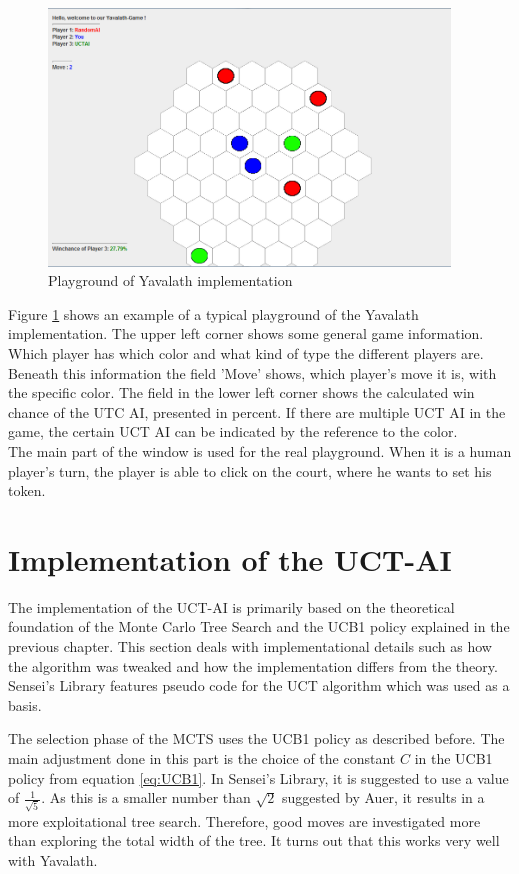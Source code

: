 \documentclass[english]{report} \usepackage[english]{babel}
\begin{document}
\begin{figure}[ht]
\centering
\includegraphics[width=0.95\textwidth]{Abbildungen/exampleOfPlayGround.png}
\caption[Playground of Yavalath implementation]{Playground of Yavalath implementation}
\label{fig:playgroundOfYav}
\end{figure} 

\noindent Figure \ref{fig:playgroundOfYav} shows an example of a typical
playground of the Yavalath implementation.
The upper left corner shows some general game information. Which player has
which color and what kind of type the different players are. Beneath this
information the field 'Move' shows, which player's move it is, with the specific
color. The field in the lower left corner shows the calculated win chance of the
UTC AI, presented in percent. If there are multiple UCT AI in the game, the
certain UCT AI can be indicated by the reference to the color.  \\
The main part of the window is used for the real playground. When it is a human
player's turn, the player is able to click on the court,
where he wants to set his 
token. 

\section{Implementation of the UCT-AI}
The implementation of the UCT-AI is primarily based on the theoretical
foundation of the Monte Carlo Tree Search and the UCB1 policy explained in the
previous chapter. This section deals with implementational details such as how
the algorithm was tweaked and how the implementation differs from the theory. 
Sensei's Library features pseudo code for the UCT algorithm which was used as a
basis.\cite{sl}


The selection phase of the MCTS uses the UCB1 policy as described before. The
main adjustment done in this part is the choice of the constant \(C\) in the
UCB1 policy from equation \ref{eq:UCB1}. In Sensei's Library, it is suggested to
use a value of \(\frac{1}{\sqrt{5}}\).\cite{sl} As this is a smaller
number than \(\sqrt{2}\) suggested by Auer, it results in a more exploitational
tree search. Therefore, good moves are investigated more than exploring the
total width of the tree. It turns out that this works very well with Yavalath.\\
\end{document}
